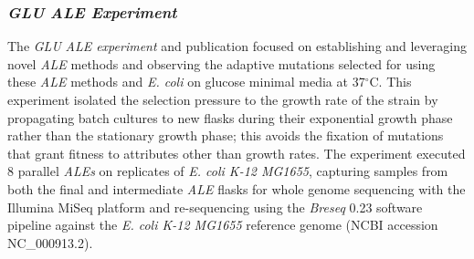 \documentclass[12pt,final,masters,chapterheads]{ucsd}  %
\begin{document}
\subsubsection{\textit{GLU} \textit{ALE Experiment}}
%
%
The \textit{GLU} \textit{ALE experiment} and publication focused on establishing and leveraging novel \textit{ALE} methods and observing the adaptive mutations selected for using these \textit{ALE} methods and \textit{E. coli} on glucose minimal media at 37$^{\circ}$C. This experiment isolated the selection pressure to the growth rate of the strain by propagating batch cultures to new flasks during their exponential growth phase rather than the stationary growth phase; this avoids the fixation of mutations that grant fitness to attributes other than growth rates. The experiment executed 8 parallel \textit{ALEs} on replicates of \textit{E. coli K-12 MG1655}, capturing samples from both the final and intermediate \textit{ALE} flasks for whole genome sequencing with the Illumina MiSeq platform and re-sequencing using the \textit{Breseq} 0.23 software pipeline against the \textit{E. coli K-12 MG1655} reference genome (NCBI accession NC\_000913.2).
\end{document}
